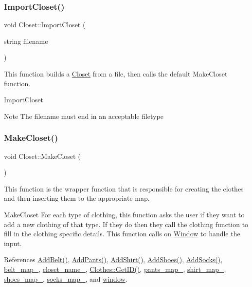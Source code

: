 \subsubsection{\texorpdfstring{Import\+Closet()}{ImportCloset()}}
{\footnotesize\ttfamily void Closet\+::\+Import\+Closet (\begin{DoxyParamCaption}\item[{string}]{filename }\end{DoxyParamCaption})}



This function builds a \mbox{\hyperlink{classCloset}{Closet}} from a file, then calls the default \textquotesingle{}Make\+Closet\textquotesingle{} function. 

Import\+Closet \begin{DoxyNote}{Note}
The filename must end in an acceptable filetype 
\end{DoxyNote}
\mbox{\label{classCloset_a1b904dfcdafe293f3f530b338afc0601}} 
\subsubsection{\texorpdfstring{Make\+Closet()}{MakeCloset()}}
{\footnotesize\ttfamily void Closet\+::\+Make\+Closet (\begin{DoxyParamCaption}{ }\end{DoxyParamCaption})}



This function is the wrapper function that is responsible for creating the clothes and then inserting them to the appropriate map. 

Make\+Closet  For each type of clothing, this function asks the user if they want to add a new clothing of that type. If they do then they call the clothing function to fill in the clothing specific details. This function calls on \textquotesingle{}\mbox{\hyperlink{classWindow}{Window}}\textquotesingle{} to handle the input. 

References \mbox{\hyperlink{classCloset_ad81782f2bb110f3a0a635a5ac1f929eb}{Add\+Belt()}}, \mbox{\hyperlink{classCloset_a86001d9aab63ec5cca05bb2daa67e755}{Add\+Pants()}}, \mbox{\hyperlink{classCloset_aba3296cf8964b43f64911cc69c56cbfd}{Add\+Shirt()}}, \mbox{\hyperlink{classCloset_a489badac5a919460e8cc8e216f8b3eac}{Add\+Shoes()}}, \mbox{\hyperlink{classCloset_aac44ecf78525b3e0ac4ed80af2133186}{Add\+Socks()}}, \mbox{\hyperlink{classCloset_a0631fe46e3c955109a613e1cd1d2cb52}{belt\+\_\+map\+\_\+}}, \mbox{\hyperlink{classCloset_a3c06676b90e6ebe31d6dd276f2f0bcef}{closet\+\_\+name\+\_\+}}, \mbox{\hyperlink{classClothes_a3f6dac172f333126d19010f85ec44e4c}{Clothes\+::\+Get\+I\+D()}}, \mbox{\hyperlink{classCloset_a8be78859dfab9e2aa09bfbbb8f191dab}{pants\+\_\+map\+\_\+}}, \mbox{\hyperlink{classCloset_a8126a023a2777b84b23436da8d1f4b35}{shirt\+\_\+map\+\_\+}}, \mbox{\hyperlink{classCloset_ab1e1ce9110a044c90244407f0f6f92c4}{shoes\+\_\+map\+\_\+}}, \mbox{\hyperlink{classCloset_a33a48dfc5ef542261bb0dd373f899f9e}{socks\+\_\+map\+\_\+}}, and \mbox{\hyperlink{classCloset_af1eb4f786cc4eccd3018b90632236a93}{window}}.


